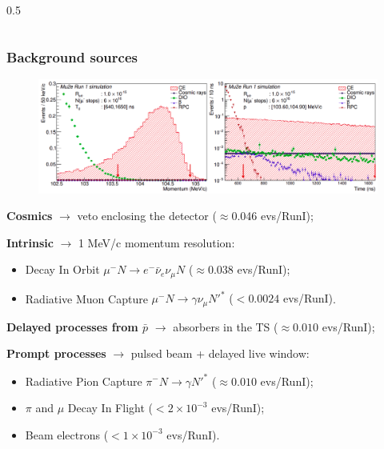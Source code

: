 \documentclass{beamer}
\begin{document}
\begin{frame}
\begin{columns}
\begin{column}{0.5\framewidth}
\begin{figure}[h]
        \end{figure} 
    \end{column}
\end{columns}
\end{frame}


\begin{frame}
    \frametitle{Background sources}
            \vspace{-3mm} 

         \begin{figure}[h]
            \centering
            \hspace*{-4ex}
            \includegraphics[width=1.\framewidth]{figures/png/Screenshot_20240225_102708.png}
        \end{figure}
        \setlength{\leftmargini}{-0.5em}
        \vspace{-3mm} 
      
    \begin{itemize}
      {\small
    \item \textbf{Cosmics} $\rightarrow$ veto enclosing the detector {\footnotesize($\approx$0.046 evs/RunI)};   
\item \textbf{Intrinsic} $\rightarrow$ 1 MeV/c momentum resolution:
\begin{itemize}
 \item Decay In Orbit $\mu^- N \rightarrow e^- \bar{\nu}_e\nu_\mu N $ {\footnotesize($\approx$0.038 evs/RunI)};
 \item Radiative Muon Capture $\mu^- N \rightarrow\gamma \nu_\mu N'^* $ {\footnotesize($<0.0024$ evs/RunI)}.
\end{itemize}
\item \textbf{Delayed processes from $\bar{p}$} $\rightarrow$ absorbers in the TS {\footnotesize($\approx0.010$ evs/RunI)};
\item \textbf{Prompt processes} $\rightarrow$ pulsed beam + delayed
live window:
\begin{itemize}
    \item Radiative Pion Capture $\pi^- N \rightarrow \gamma N' ^*$ {\footnotesize($\approx0.010$ evs/RunI)};
 \item $\pi$ and $\mu$ Decay In Flight {\footnotesize($<2\times 10^{-3}$ evs/RunI)};
 \item Beam electrons {\footnotesize($<1\times 10^{-3}$ evs/RunI)}.
     \end{itemize}
       }
      \end{itemize}
\end{frame}
\end{document}
